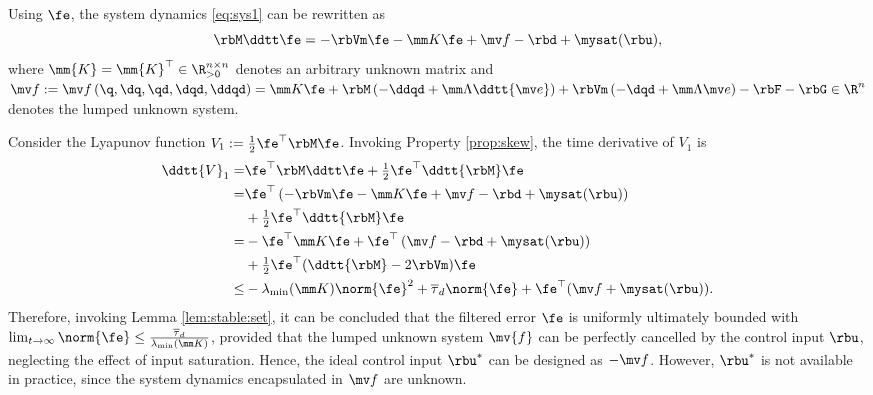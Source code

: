 \documentclass[letterpaper, journal]{IEEEtran}
\begin{document}
Using $\fe$, the system dynamics \eqref{eq:sys1} can be rewritten as
\begin{equation}
    \rbM \ddtt\fe
    =
    -\rbVm \fe
    -\mm K \fe
    + \mv f
    -\rbd + \mysat(\rbu)
    ,
    \label{eq:sys:filtered}
\end{equation}
where $\mm{K}=\mm{K}^\top\in\R^{n\times n}_{>0}$ denotes an arbitrary unknown matrix and $
    \mv f:= \mv f
    \left(
        \q,\dq,\qd,\dqd,\ddqd
    \right)
    =
    \mm K \fe
    +\rbM
    \left(
        -\ddqd+\mm\Lambda\ddtt{\mv e}
    \right)
    +
    \rbVm
    \left(
        -\dqd+\mm\Lambda\mv e
    \right)
    -
    \rbF
    -
    \rbG
    \in\R^n
$ denotes the lumped unknown system.

Consider the Lyapunov function $V_1:= \tfrac{1}{2}\fe^\top \rbM\fe$. 
Invoking Property \ref{prop:skew}, the time derivative of $V_1$ is
\begin{equation}
    \begin{aligned}
        \ddtt{V}_1
        =&
        \fe^\top \rbM \ddtt \fe
        +
        \tfrac{1}{2}\fe^\top \ddtt{\rbM}\fe
        \\
        =&
        \fe^\top 
        \left(
            -\rbVm \fe -\mm K \fe + \mv f
            -\rbd + \mysat(\rbu)
        \right)
        \\
        &
        +
        \tfrac{1}{2}
        \fe^\top \ddtt{\rbM}\fe
        \\
        =&
        -
        \fe^\top \mm K \fe 
        +
        \fe^\top 
        \left(
            \mv f
            -\rbd
            +\mysat(\rbu)
        \right)
        \\
        &
        +
        \tfrac{1}{2}
        \fe^\top(\ddtt{\rbM}- 2\rbVm)\fe
        \\
        \le&
        -\lambda_{\min}(\mm K)\norm{\fe}^2
        +
        \overline\tau_d\norm{\fe}
        +
        \fe^\top (\mv f+\mysat(\rbu))
        .
    \end{aligned}
    \label{eq:lya1:dot1}
\end{equation} 
Therefore, invoking Lemma \ref{lem:stable:set}, it can be concluded that the filtered error $\fe$ is uniformly ultimately bounded with $\lim_{t\to\infty}\norm{\fe}\le\tfrac{\overline\tau_d}{\lambda_{\min}(\mm K)}$, provided that the lumped unknown system $\mv{f}$ can be perfectly cancelled by the control input $\rbu$, neglecting the effect of input saturation.
Hence, the ideal control input $\rbu^*$ can be designed as $-\mv f$.
However, $\rbu^*$ is not available in practice, since the system dynamics encapsulated in $\mv f$ are unknown.
\end{document}
